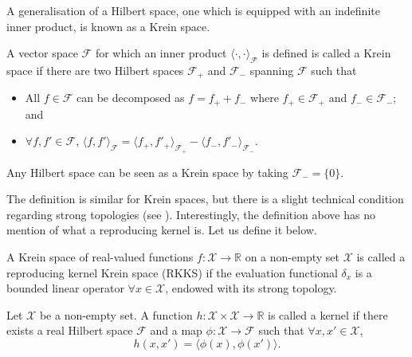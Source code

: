 
A generalisation of a Hilbert space, one which is equipped with an indefinite inner product, is known as a Krein space.

\begin{definition}\label{def:krein}
	A vector space $\mathcal F$ for which an inner product $\langle\cdot,\cdot\rangle_{\mathcal F}$ is defined is called a Krein space if there are two Hilbert spaces $\mathcal{F}_+$ and $\mathcal{F}_-$ spanning $\mathcal F$ such that
	\begin{itemize}
		\item All $f \in \mathcal F$ can be decomposed as $f = f_+ + f_-$ where $f_+ \in \mathcal{F}_+$ and $f_- \in \mathcal{F}_-$; and
		\item $\forall f, f' \in \mathcal F$, $\langle f, f' \rangle_{\mathcal F} = \langle f_+, f'_+ \rangle_{\mathcal{F_+}} - \langle f_-, f'_- \rangle_{\mathcal{F_-}}$.
	\end{itemize}
\end{definition}

Any Hilbert space can be seen as a Krein space by taking $\mathcal{F_-} = \{0\}$.

The definition is similar for Krein spaces, but there is a slight technical condition regarding strong topologies (see \citeauthor{Ong2004}). 
Interestingly, the definition above has no mention of what a reproducing kernel is. Let us define it below. 

\begin{definition}
	A Krein space of real-valued functions $f:\mathcal X \rightarrow \mathbb R$ on a non-empty set $\mathcal X$ is called a reproducing kernel Krein space (RKKS) if the evaluation functional $\delta_x$ is a bounded linear operator $\forall x \in \mathcal X$, endowed with its strong topology.
\end{definition}

\begin{definition}[Kernels]
	Let $\mathcal X$ be a non-empty set. A function $h:\mathcal X\times\mathcal X\rightarrow\mathbb R$ is called a kernel if there exists a real Hilbert space $\mathcal F$ and a map $\phi:\mathcal X \rightarrow \mathcal F$ such that $\forall x,x' \in \mathcal X$,
$$
h(x,x') = \langle \phi(x), \phi(x') \rangle.
$$
\end{definition}

